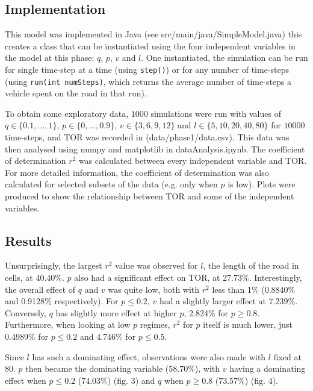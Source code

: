 \documentclass{article}
\begin{document}
\subsection*{Implementation}

This model was implemented in Java (see src/main/java/SimpleModel.java) this creates a class that can be instantiated using the four independent variables in the model at this phase: $q$, $p$, $v$ and $l$. One instantiated, the simulation can be run for single time-step at a time (using \texttt{step()}) or for any number of time-steps (using \texttt{run(int numSteps)}, which returns the average number of time-steps a vehicle spent on the road in that run).

To obtain some exploratory data, $1000$ simulations were run with values of $q \in \{0.1, \dots , 1\}$, $p \in \{0, \dots , 0.9\}$, $v \in \{3, 6, 9, 12\}$ and $l \in \{5, 10, 20, 40, 80\}$ for $10000$ time-steps, and TOR was recorded in (data/phase1/data.csv). This data was then analysed using numpy and matplotlib in dataAnalysis.ipynb. The coefficient of determination $r^{2}$ was calculated between every independent variable and TOR. For more detailed information, the coefficient of determination was also calculated for selected subsets of the data (e.g. only when $p$ is low). Plots were produced to show the relationship between TOR and some of the independent variables.

\subsection*{Results}

Unsurprisingly, the largest $r^{2}$ value was observed for $l$, the length of the road in cells, at 40.40\%. $p$ also had a significant effect on TOR, at 27.73\%. Interestingly, the overall effect of $q$ and $v$ was quite low, both with $r^{2}$ less than 1\% (0.8840\% and 0.9128\% respectively). For $p \leq 0.2$, $v$ had a slightly larger effect at 7.239\%. Conversely, $q$ has slightly more effect at higher $p$, 2.824\% for $p \geq 0.8$. Furthermore, when looking at low $p$ regimes, $r^{2}$ for $p$ itself is much lower, just 0.4989\% for $p \leq 0.2$ and 4.746\% for $p \leq 0.5$.

Since $l$ has such a dominating effect, observations were also made with $l$ fixed at 80. $p$ then became the dominating variable (58.70\%), with $v$ having a dominating effect when $p \leq 0.2$ (74.03\%) (fig. 3) and $q$ when $p \geq 0.8$ (73.57\%) (fig. 4).
\end{document}
